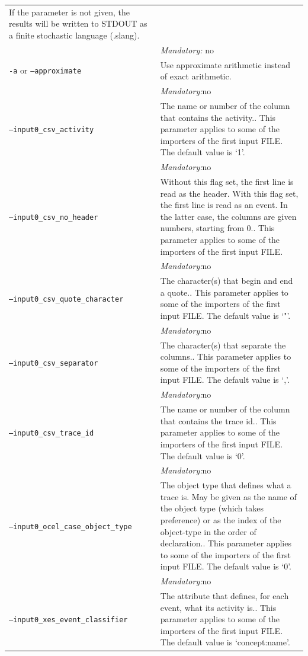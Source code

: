 {\begin{tabularx}{\linewidth}{lX}
If the parameter is not given, the results will be written to STDOUT as a finite stochastic language (.slang).\\
&\textit{Mandatory:} \quad no\\
\texttt{-a} or \texttt{--approximate} & Use approximate arithmetic instead of exact arithmetic.\\
&\textit{Mandatory:}\quad no\\
\texttt{--input0\_csv\_activity} & The name or number of the column that contains the activity.. This parameter applies to some of the importers of the first input FILE. The default value is `1'.\\
&\textit{Mandatory:}\quad no\\
\texttt{--input0\_csv\_no\_header} & Without this flag set, the first line is read as the header. 
    With this flag set, the first line is read as an event. In the latter case, the columns are given numbers, starting from 0.. This parameter applies to some of the importers of the first input FILE. \\
&\textit{Mandatory:}\quad no\\
\texttt{--input0\_csv\_quote\_character} & The character(s) that begin and end a quote.. This parameter applies to some of the importers of the first input FILE. The default value is `"'.\\
&\textit{Mandatory:}\quad no\\
\texttt{--input0\_csv\_separator} & The character(s) that separate the columns.. This parameter applies to some of the importers of the first input FILE. The default value is `,'.\\
&\textit{Mandatory:}\quad no\\
\texttt{--input0\_csv\_trace\_id} & The name or number of the column that contains the trace id.. This parameter applies to some of the importers of the first input FILE. The default value is `0'.\\
&\textit{Mandatory:}\quad no\\
\texttt{--input0\_ocel\_case\_object\_type} & The object type that defines what a trace is. May be given as the name of the object type (which takes preference) or as the index of the object-type in the order of declaration.. This parameter applies to some of the importers of the first input FILE. The default value is `0'.\\
&\textit{Mandatory:}\quad no\\
\texttt{--input0\_xes\_event\_classifier} & The attribute that defines, for each event, what its activity is.. This parameter applies to some of the importers of the first input FILE. The default value is `concept:name'.\\

\end{tabularx}}
